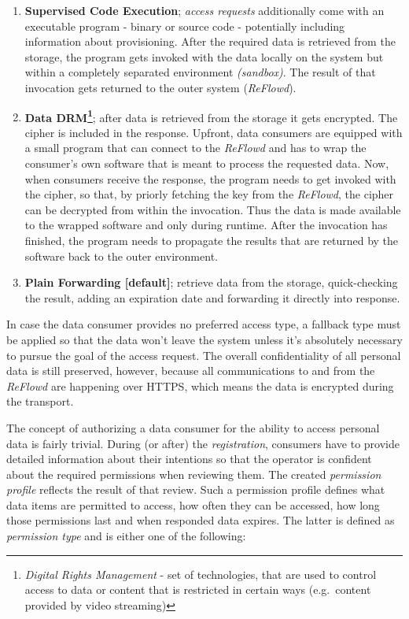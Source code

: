 \documentclass[12pt,english,a4paper,titlepage,cleardoublepage=empty,dottedtoc]{report}
\begin{document}
\begin{enumerate}
\def\labelenumi{\alph{enumi})}
\item
  \textbf{Supervised Code Execution}; \emph{access requests}
  additionally come with an executable program - binary or source code -
  potentially including information about provisioning. After the
  required data is retrieved from the storage, the program gets invoked
  with the data locally on the system but within a completely separated
  environment \emph{(sandbox)}. The result of that invocation gets
  returned to the outer system (\emph{ReFlowd}).
\item
  \textbf{Data DRM\footnote{\emph{Digital Rights Management} - set of
    technologies, that are used to control access to data or content
    that is restricted in certain ways (e.g.~content provided by video
    streaming)}}; after data is retrieved from the storage it gets
  encrypted. The cipher is included in the response. Upfront, data
  consumers are equipped with a small program that can connect to the
  \emph{ReFlowd} and has to wrap the consumer's own software that is
  meant to process the requested data. Now, when consumers receive the
  response, the program needs to get invoked with the cipher, so that,
  by priorly fetching the key from the \emph{ReFlowd}, the cipher can be
  decrypted from within the invocation. Thus the data is made available
  to the wrapped software and only during runtime. After the invocation
  has finished, the program needs to propagate the results that are
  returned by the software back to the outer environment.
\item
  \textbf{Plain Forwarding {[}default{]}}; retrieve data from the
  storage, quick-checking the result, adding an expiration date and
  forwarding it directly into response.
\end{enumerate}

In case the data consumer provides no preferred access type, a fallback
type must be applied so that the data won't leave the system unless it's
absolutely necessary to pursue the goal of the access request. The
overall confidentiality of all personal data is still preserved,
however, because all communications to and from the \emph{ReFlowd} are
happening over HTTPS, which means the data is encrypted during the
transport.

The concept of authorizing a data consumer for the ability to access
personal data is fairly trivial. During (or after) the
\emph{registration}, consumers have to provide detailed information
about their intentions so that the operator is confident about the
required permissions when reviewing them. The created \emph{permission
profile} reflects the result of that review. Such a permission profile
defines what data items are permitted to access, how often they can be
accessed, how long those permissions last and when responded data
expires. The latter is defined as \emph{permission type} and is either
one of the following:
\end{document}
